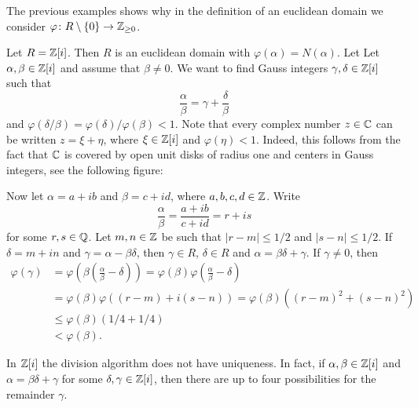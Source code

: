 The previous examples shows why in the definition of an euclidean domain 
we consider $\varphi\colon R\setminus\{0\}\to\mathbb{Z}_{\geq0}$. 

\begin{example}
	Let $R=\mathbb{Z}[i]$. Then $R$ is an euclidean domain with $\varphi(\alpha)=N(\alpha)$. Let 
	Let $\alpha,\beta\in\mathbb{Z}[i]$ and assume that $\beta\ne0$. 
	We want to find Gauss integers $\gamma,\delta\in\mathbb{Z}[i]$ such that 
	\[
	\frac{\alpha}{\beta}=\gamma+\frac{\delta}{\beta}
	\]
	and
	$\varphi(\delta/\beta)=\varphi(\delta)/\varphi(\beta)<1$. Note that every complex
	number $z\in\mathbb{C}$ can be written $z=\xi+\eta$, where $\xi\in\mathbb{Z}[i]$ and $\varphi(\eta)<1$. Indeed, this
	follows from the fact that 
	$\mathbb{C}$ is covered by open unit disks of radius one and centers in Gauss integers, see the following figure:

	\begin{figure}
		\centering
\label{fig:covering}
\end{figure}
	
	Now let $\alpha=a+ib$ and $\beta=c+id$, where $a,b,c,d\in\mathbb{Z}$.  
	Write 
	\[
	\frac{\alpha}{\beta}=\frac{a+ib}{c+id}=r+is
	\]
	for some $r,s\in\mathbb{Q}$. Let $m,n\in\mathbb{Z}$ be such that $|r-m|\leq 1/2$ and 
	$|s-n|\leq 1/2$. If $\delta=m+in$ and $\gamma=\alpha-\beta\delta$, then 
	$\gamma\in R$, $\delta\in R$ and $\alpha=\beta\delta+\gamma$. If $\gamma\ne0$, then
	\begin{align*}
	\varphi(\gamma)&=\varphi\left(\beta\left(\frac{\alpha}{\beta}-\delta\right)\right)
	=\varphi(\beta)\varphi\left(\frac{\alpha}{\beta}-\delta\right)\\
	&=\varphi(\beta)\varphi((r-m)+i(s-n))
	=\varphi(\beta)((r-m)^2+(s-n)^2)\\
	&\leq\varphi(\beta)(1/4+1/4)\\
	&<\varphi(\beta).
	\end{align*}	
\end{example}

In $\mathbb{Z}[i]$ the division algorithm does not have uniqueness. In fact, 
if $\alpha,\beta\in\mathbb{Z}[i]$ and $\alpha=\beta\delta+\gamma$ 
for some $\delta,\gamma\in\mathbb{Z}[i]$, 
then there are up to four possibilities 
for the remainder $\gamma$.


